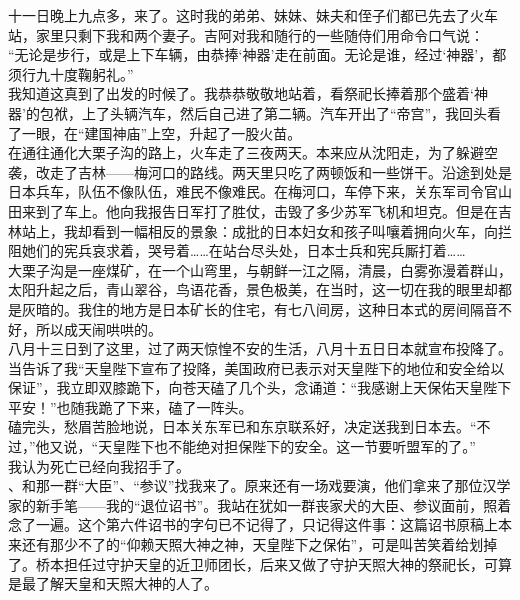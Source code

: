 十一日晚上九点多，来了。这时我的弟弟、妹妹、妹夫和侄子们都已先去了火车站，家里只剩下我和两个妻子。吉阿对我和随行的一些随侍们用命令口气说：\\

“无论是步行，或是上下车辆，由恭捧‘神器’走在前面。无论是谁，经过‘神器’，都须行九十度鞠躬礼。”\\

我知道这真到了出发的时候了。我恭恭敬敬地站着，看祭祀长捧着那个盛着‘神器’的包袱，上了头辆汽车，然后自己进了第二辆。汽车开出了“帝宫”，我回头看了一眼，在“建国神庙”上空，升起了一股火苗。\\

在通往通化大栗子沟的路上，火车走了三夜两天。本来应从沈阳走，为了躲避空袭，改走了吉林——梅河口的路线。两天里只吃了两顿饭和一些饼干。沿途到处是日本兵车，队伍不像队伍，难民不像难民。在梅河口，车停下来，关东军司令官山田来到了车上。他向我报告日军打了胜仗，击毁了多少苏军飞机和坦克。但是在吉林站上，我却看到一幅相反的景象：成批的日本妇女和孩子叫嚷着拥向火车，向拦阻她们的宪兵哀求着，哭号着……在站台尽头处，日本士兵和宪兵厮打着……\\

大栗子沟是一座煤矿，在一个山弯里，与朝鲜一江之隔，清晨，白雾弥漫着群山，太阳升起之后，青山翠谷，鸟语花香，景色极美，在当时，这一切在我的眼里却都是灰暗的。我住的地方是日本矿长的住宅，有七八间房，这种日本式的房间隔音不好，所以成天闹哄哄的。\\

八月十三日到了这里，过了两天惊惶不安的生活，八月十五日日本就宣布投降了。\\

当告诉了我“天皇陛下宣布了投降，美国政府已表示对天皇陛下的地位和安全给以保证”，我立即双膝跪下，向苍天磕了几个头，念诵道：“我感谢上天保佑天皇陛下平安！”也随我跪了下来，磕了一阵头。\\

磕完头，愁眉苦脸地说，日本关东军已和东京联系好，决定送我到日本去。“不过，”他又说，“天皇陛下也不能绝对担保陛下的安全。这一节要听盟军的了。”\\

我认为死亡已经向我招手了。\\

、和那一群“大臣”、“参议”找我来了。原来还有一场戏要演，他们拿来了那位汉学家的新手笔——我的“退位诏书”。我站在犹如一群丧家犬的大臣、参议面前，照着念了一遍。这个第六件诏书的字句已不记得了，只记得这件事：这篇诏书原稿上本来还有那少不了的“仰赖天照大神之神，天皇陛下之保佑”，可是叫苦笑着给划掉了。桥本担任过守护天皇的近卫师团长，后来又做了守护天照大神的祭祀长，可算是最了解天皇和天照大神的人了。\\

